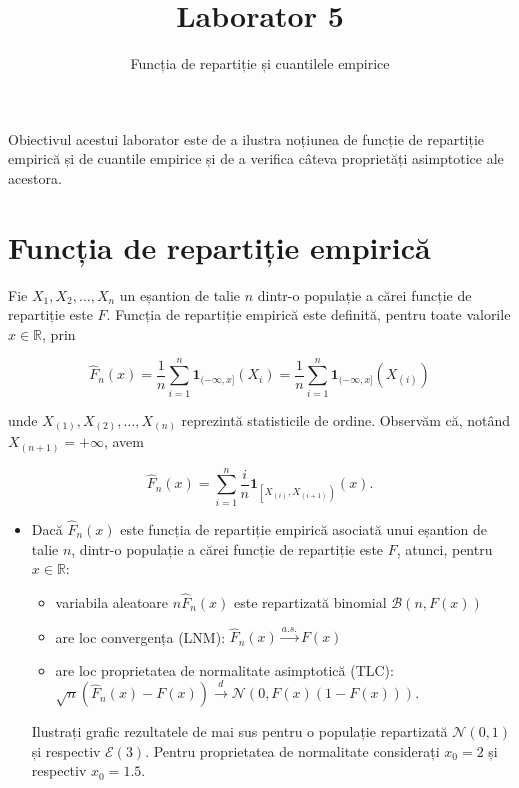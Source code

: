 \documentclass[]{article}
\title{Laborator 5}
\subtitle{Funcția de repartiție și cuantilele empirice}
\author{}
\date{}
\providecommand{\tightlist}{%
  \setlength{\itemsep}{0pt}\setlength{\parskip}{0pt}}
\newenvironment{frshaded*}{%
  \def\FrameCommand{\fboxrule=\FrameRule\fboxsep=\FrameSep \fcolorbox{framecolor}{shadecolor1}}%
  \MakeFramed {\advance\hsize-\width \FrameRestore}}%
{\endMakeFramed}
\newenvironment{rmdblock}[1]
  {\begin{frshaded*}
  \begin{itemize}
  \renewcommand{\labelitemi}{
    \raisebox{-.7\height}[0pt][0pt]{
      {\setkeys{Gin}{width=2em,keepaspectratio}\texttt{[image: images/icons/\#1]}}
    }
  }
  \item
  }
  {
  \end{itemize}
  \end{frshaded*}
  }
\newenvironment{rmdexercise}
  {\begin{rmdblock}{exercise}}
  {\end{rmdblock}}
\begin{document}
\maketitle

\thispagestyle{fancy}

Obiectivul acestui laborator este de a ilustra noțiunea de funcție de
repartiție empirică și de cuantile empirice și de a verifica câteva
proprietăți asimptotice ale acestora.

\hypertarget{funcux21bia-de-repartiux21bie-empiricux103}{%
\section{Funcția de repartiție
empirică}\label{funcux21bia-de-repartiux21bie-empiricux103}}

Fie \(X_1,X_2,\ldots,X_n\) un eșantion de talie \(n\) dintr-o populație
a cărei funcție de repartiție este \(F\). Funcția de repartiție empirică
este definită, pentru toate valorile \(x\in\mathbb{R}\), prin

\[
  \hat{F}_n(x) = \frac{1}{n}\sum_{i = 1}^{n}\mathbf{1}_{(-\infty, x]}(X_i) = \frac{1}{n}\sum_{i = 1}^{n}\mathbf{1}_{(-\infty, x]}(X_{(i)})
\]

unde \(X_{(1)}, X_{(2)}, \ldots, X_{(n)}\) reprezintă statisticile de
ordine. Observăm că, notând \(X_{(n+1)} = +\infty\), avem

\[
  \hat{F}_n(x) = \sum_{i = 1}^{n}\frac{i}{n}\mathbf{1}_{\left[X_{(i)}, X_{(i+1)}\right)}(x).
\]

\begin{rmdexercise}
Dacă \(\hat{F}_n(x)\) este funcția de repartiție empirică asociată unui
eșantion de talie \(n\), dintr-o populație a cărei funcție de repartiție
este \(F\), atunci, pentru \(x\in\mathbb{R}\):

\begin{itemize}
\tightlist
\item
  variabila aleatoare \(n\hat{F}_n(x)\) este repartizată binomial
  \(\mathcal{B}(n, F(x))\)
\item
  are loc convergența (LNM): \(\hat{F}_n(x)\overset{a.s.}{\to} F(x)\)
\item
  are loc proprietatea de normalitate asimptotică (TLC):
  \(\sqrt{n}(\hat{F}_n(x) - F(x))\overset{d}{\to}\mathcal{N}(0,F(x)(1-F(x)))\).
\end{itemize}

Ilustrați grafic rezultatele de mai sus pentru o populație repartizată
\(\mathcal{N}(0,1)\) și respectiv \(\mathcal{E}(3)\). Pentru
proprietatea de normalitate considerați \(x_0 = 2\) și respectiv
\(x_0 = 1.5\).
\end{rmdexercise}
\end{document}
